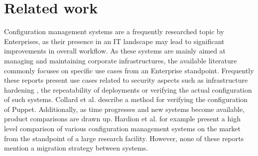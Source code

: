 \section{Related work}\label{sec:relatedwork}
Configuration management systems are a frequently researched topic by Enterprises, as their presence in an IT landscape may lead to significant improvements in overall workflow. As these systems are mainly aimed at managing and maintaining corporate infrastructures, the available literature commonly focuses on specific use cases from an Enterprise standpoint. Frequently these reports present use cases related to security aspects such as infrastructure hardening \cite{dotson2014security}, the repeatability of deployments \cite{ruiz2015reconstructable} or verifying the actual configuration of such systems. Collard et al. \cite{Collard2015} describe a method for verifying the configuration of Puppet. Additionally, as time progresses and new systems become available, product comparisons are drawn up. Hardion et al. \cite{Hardion2013} for example present a high level comparison of various configuration management systems on the market from the standpoint of a large research facility. However, none of these reports mention a migration strategy between systems.

